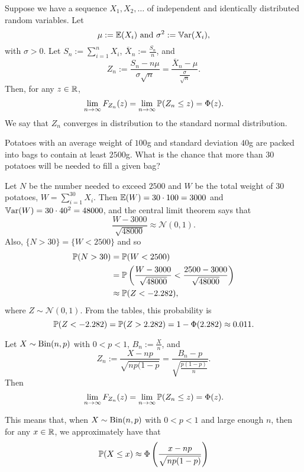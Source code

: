 \documentclass[10pt, a4paper]{article}
\begin{document}
\begin{theorem}
    Suppose we have a sequence $X_1, X_2, \dotsc$ of independent and identically distributed random variables.
    Let
    \[
    \mu := \E(X_i) \text{ and } \sigma ^ 2 := \Var(X_i),
    \]
    with $\sigma > 0$.
    Let $S_n := \sum_{i = 1}^{n}X_i$,
    $\overline{X}_n := \frac{S_n}{n}$,
    and
    \[
    Z_n := \frac{S_n - n\mu}{\sigma\sqrt{n}} = \frac{\overline{X}_n - \mu}{\frac{\sigma}{\sqrt{n}}}.
    \]
    Then,
    for any $z \in \R$,
    \[
    \lim_{n \rightarrow \infty}F_{Z_n}(z) = \lim_{n \rightarrow \infty}\P(Z_n \leq z) = \Phi(z).
    \]
    We say that $Z_n$ converges in distribution to the standard normal distribution.
\end{theorem}

\begin{example}
    Potatoes with an average weight of $100$g and standard deviation $40$g are packed into bags to contain at least $2500$g.
    What is the chance that more than $30$ potatoes will be needed to fill a given bag?
    
    
    Let $N$ be the number needed to exceed $2500$ and $W$ be the total weight of $30$ potatoes,
    $W = \sum_{i = 1}^{30}X_i$.
    Then $\E(W) = 30 \cdot 100 = 3000$ and $\Var(W) = 30 \cdot 40 ^ 2 = 48000$,
    and the central limit theorem says that
    \[
    \frac{W - 3000}{\sqrt{48000}} \approx \mathcal{N}(0, 1).
    \]
    Also,
    $\{N > 30\} = \{W < 2500\}$ and so
    \begin{align*}
        \P(N > 30) &= \P(W < 2500) \\
        &= \P\left(\frac{W - 3000}{\sqrt{48000}} < \frac{2500 - 3000}{\sqrt{48000}}\right) \\
        &\approx \P(Z < -2.282),
    \end{align*}
    where $Z \sim \mathcal{N}(0, 1)$.
    From the tables,
    this probability is
    \[
    \P(Z < -2.282) = \P(Z > 2.282) = 1 - \Phi(2.282) \approx 0.011.
    \]
\end{example}

\begin{corollary}
    Let $X \sim \Bin(n, p)$ with $0 < p < 1$,
    $B_n := \frac{X}{n}$,
    and
    \[
    Z_n := \frac{X - np}{\sqrt{np(1 - p}} = \frac{B_n - p}{\sqrt{\frac{p(1 - p)}{n}}}.
    \]
    Then
    \[
    \lim_{n \rightarrow \infty}F_{Z_n}(z) = \lim_{n \rightarrow \infty}\P(Z_n \leq z) = \Phi(z).
    \]
\end{corollary}
This means that,
when $X \sim \Bin(n, p)$ with $0 < p < 1$ and large enough $n$,
then for any $x \in \R$,
we approximately have that
\[
\P(X \leq x) \approx \Phi\left(\frac{x - np}{\sqrt{np(1 - p)}}\right)
\]
\end{document}

